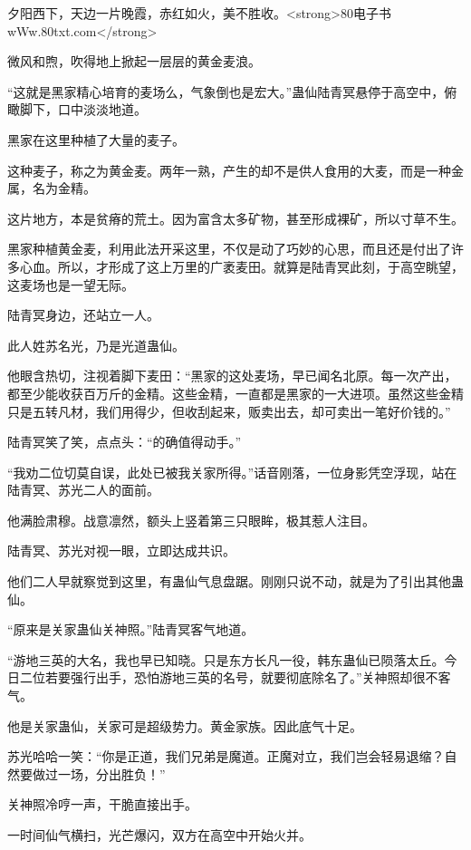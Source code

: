 
\begin{this_body}

夕阳西下，天边一片晚霞，赤红如火，美不胜收。<strong>80电子书wWw.80txt.com</strong>

微风和煦，吹得地上掀起一层层的黄金麦浪。

“这就是黑家精心培育的麦场么，气象倒也是宏大。”蛊仙陆青冥悬停于高空中，俯瞰脚下，口中淡淡地道。

黑家在这里种植了大量的麦子。

这种麦子，称之为黄金麦。两年一熟，产生的却不是供人食用的大麦，而是一种金属，名为金精。

这片地方，本是贫瘠的荒土。因为富含太多矿物，甚至形成裸矿，所以寸草不生。

黑家种植黄金麦，利用此法开采这里，不仅是动了巧妙的心思，而且还是付出了许多心血。所以，才形成了这上万里的广袤麦田。就算是陆青冥此刻，于高空眺望，这麦场也是一望无际。

陆青冥身边，还站立一人。

此人姓苏名光，乃是光道蛊仙。

他眼含热切，注视着脚下麦田：“黑家的这处麦场，早已闻名北原。每一次产出，都至少能收获百万斤的金精。这些金精，一直都是黑家的一大进项。虽然这些金精只是五转凡材，我们用得少，但收刮起来，贩卖出去，却可卖出一笔好价钱的。”

陆青冥笑了笑，点点头：“的确值得动手。”

“我劝二位切莫自误，此处已被我关家所得。”话音刚落，一位身影凭空浮现，站在陆青冥、苏光二人的面前。

他满脸肃穆。战意凛然，额头上竖着第三只眼眸，极其惹人注目。

陆青冥、苏光对视一眼，立即达成共识。

他们二人早就察觉到这里，有蛊仙气息盘踞。刚刚只说不动，就是为了引出其他蛊仙。

“原来是关家蛊仙关神照。”陆青冥客气地道。

“游地三英的大名，我也早已知晓。只是东方长凡一役，韩东蛊仙已陨落太丘。今日二位若要强行出手，恐怕游地三英的名号，就要彻底除名了。”关神照却很不客气。

他是关家蛊仙，关家可是超级势力。黄金家族。因此底气十足。

苏光哈哈一笑：“你是正道，我们兄弟是魔道。正魔对立，我们岂会轻易退缩？自然要做过一场，分出胜负！”

关神照冷哼一声，干脆直接出手。

一时间仙气横扫，光芒爆闪，双方在高空中开始火并。


\end{this_body}
